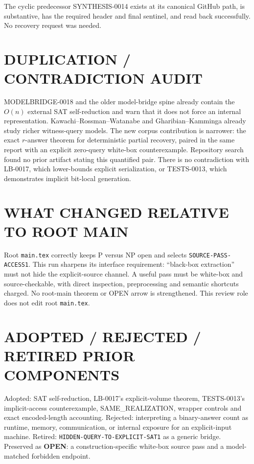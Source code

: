 \documentclass[11pt]{article}
\newcommand{\OPEN}{\textbf{OPEN}}
\begin{document}
The cyclic predecessor SYNTHESIS-0014 exists at its canonical GitHub path, is
substantive, has the required header and final sentinel, and read back
successfully.  No recovery request was needed.

\section{DUPLICATION / CONTRADICTION AUDIT}

MODELBRIDGE-0018 and the older model-bridge spine already contain the $O(n)$
external SAT self-reduction and warn that it does not force an internal
representation.  Kawachi--Rossman--Watanabe and Gharibian--Kamminga already
study richer witness-query models.  The new corpus contribution is narrower:
the exact $r$-answer theorem for deterministic partial recovery, paired in the
same report with an explicit zero-query white-box counterexample.  Repository
search found no prior artifact stating this quantified pair.  There is no
contradiction with LB-0017, which lower-bounds explicit serialization, or
TESTS-0013, which demonstrates implicit bit-local generation.

\section{WHAT CHANGED RELATIVE TO ROOT MAIN}

Root \texttt{main.tex} correctly keeps P versus NP open and selects
\texttt{SOURCE-PASS-ACCESS1}.  This run sharpens its interface requirement:
``black-box extraction'' must not hide the explicit-source channel.  A useful
pass must be white-box and source-checkable, with direct inspection,
preprocessing and semantic shortcuts charged.  No root-main theorem or OPEN
arrow is strengthened.  This review role does not edit root \texttt{main.tex}.

\section{ADOPTED / REJECTED / RETIRED PRIOR COMPONENTS}

Adopted: SAT self-reduction, LB-0017's explicit-volume theorem, TESTS-0013's
implicit-access counterexample, SAME\_REALIZATION, wrapper controls and exact
encoded-length accounting.  Rejected: interpreting a binary-answer count as
runtime, memory, communication, or internal exposure for an explicit-input
machine.  Retired: \texttt{HIDDEN-QUERY-TO-EXPLICIT-SAT1} as a generic bridge.
Preserved as \OPEN: a construction-specific white-box source pass and a
model-matched forbidden endpoint.
\end{document}
